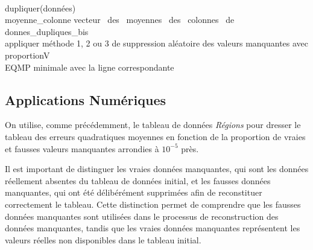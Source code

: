 \documentclass[12pt, openany, fleqn, french]{article}
\begin{document}
\begin{algorithm}[H]
\footnotesize
    \State {}\\
    \State dupliquer(données)\\
    \State moyenne\_colonne \gets vecteur \, des \, moyennes \, des \, colonnes \, de \, donnes\_dupliques\_bis \\
    \State {} {appliquer méthode 1, 2 ou 3 de suppression aléatoire des valeurs manquantes avec proportionV}\\
    \State \Return EQMP minimale avec la ligne correspondante\\
    \EndFunction
\end{algorithm}

\newpage

\subsection{Applications Numériques}

On utilise, comme précédemment, le tableau de données \textit{Régions} pour dresser le tableau des erreurs quadratiques moyennes en fonction de la proportion de vraies et fausses valeurs manquantes arrondies à $10^{-5}$ près.

Il est important de distinguer les vraies données manquantes, qui sont les données réellement absentes du tableau de données initial, et les fausses données manquantes, qui ont été délibérément supprimées afin de reconstituer correctement le tableau. Cette distinction permet de comprendre que les fausses données manquantes sont utilisées dans le processus de reconstruction des données manquantes, tandis que les vraies données manquantes représentent les valeurs réelles non disponibles dans le tableau initial.
\end{document}
